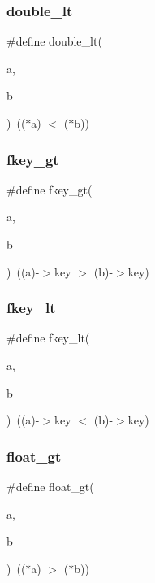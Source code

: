 \subsubsection{\texorpdfstring{double\+\_\+lt}{double\_lt}}
{\footnotesize\ttfamily \#define double\+\_\+lt(\begin{DoxyParamCaption}\item[{}]{a,  }\item[{}]{b }\end{DoxyParamCaption})~(($\ast$a) $<$ ($\ast$b))}

\mbox{\label{a00140_aaed10788298735e5b3c86a486d042e3d}} 
\subsubsection{\texorpdfstring{fkey\+\_\+gt}{fkey\_gt}}
{\footnotesize\ttfamily \#define fkey\+\_\+gt(\begin{DoxyParamCaption}\item[{}]{a,  }\item[{}]{b }\end{DoxyParamCaption})~((a)-\/$>$key $>$ (b)-\/$>$key)}

\mbox{\label{a00140_ab5cae7ca35b402e472e555682bd250be}} 
\subsubsection{\texorpdfstring{fkey\+\_\+lt}{fkey\_lt}}
{\footnotesize\ttfamily \#define fkey\+\_\+lt(\begin{DoxyParamCaption}\item[{}]{a,  }\item[{}]{b }\end{DoxyParamCaption})~((a)-\/$>$key $<$ (b)-\/$>$key)}

\mbox{\label{a00140_a0430c14a975f635bf512a8bbbe3e88f4}} 
\subsubsection{\texorpdfstring{float\+\_\+gt}{float\_gt}}
{\footnotesize\ttfamily \#define float\+\_\+gt(\begin{DoxyParamCaption}\item[{}]{a,  }\item[{}]{b }\end{DoxyParamCaption})~(($\ast$a) $>$ ($\ast$b))}

